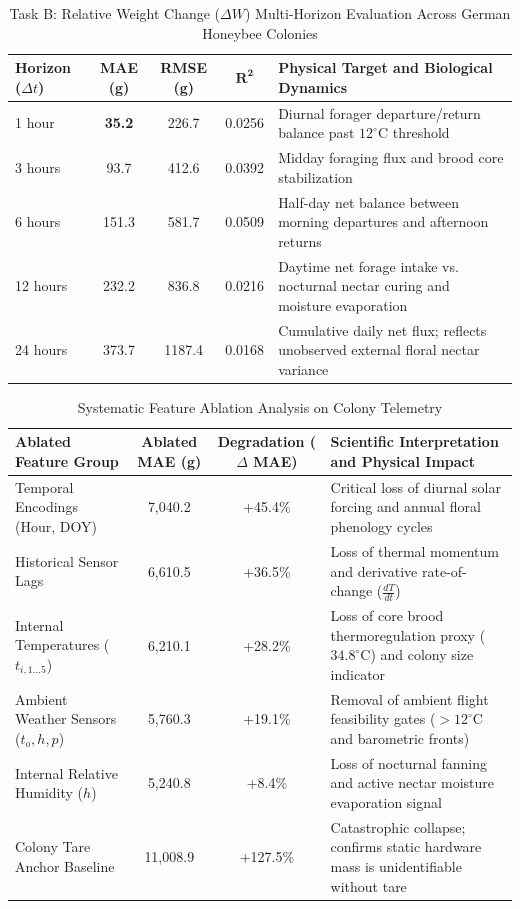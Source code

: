 \documentclass[10pt,twocolumn]{article}
\begin{document}
\begin{table}[t]
\centering
\small
\caption{Task B: Relative Weight Change ($\Delta W$) Multi-Horizon Evaluation Across German Honeybee Colonies}
\label{tab:task_b}
\vspace{0.1cm}
\begin{tabularx}{\textwidth}{l c c c X}
\toprule
\textbf{Horizon ($\Delta t$)} & \textbf{MAE (g)} & \textbf{RMSE (g)} & $\mathbf{R^2}$ & \textbf{Physical Target and Biological Dynamics} \\
\midrule
1 hour & \textbf{35.2} & 226.7 & 0.0256 & Diurnal forager departure/return balance past $12^\circ\text{C}$ threshold \\
3 hours & 93.7 & 412.6 & 0.0392 & Midday foraging flux and brood core stabilization \\
6 hours & 151.3 & 581.7 & 0.0509 & Half-day net balance between morning departures and afternoon returns \\
12 hours & 232.2 & 836.8 & 0.0216 & Daytime net forage intake vs. nocturnal nectar curing and moisture evaporation \\
24 hours & 373.7 & 1187.4 & 0.0168 & Cumulative daily net flux; reflects unobserved external floral nectar variance \\
\bottomrule
\end{tabularx}
\end{table}

\begin{table}[t]
\centering
\small
\caption{Systematic Feature Ablation Analysis on Colony Telemetry}
\label{tab:ablation}
\vspace{0.1cm}
\begin{tabularx}{\textwidth}{l c c X}
\toprule
\textbf{Ablated Feature Group} & \textbf{Ablated MAE (g)} & \textbf{Degradation ($\Delta$ MAE)} & \textbf{Scientific Interpretation and Physical Impact} \\
\midrule
Temporal Encodings (Hour, DOY) & 7,040.2 & +45.4\% & Critical loss of diurnal solar forcing and annual floral phenology cycles \\
Historical Sensor Lags & 6,610.5 & +36.5\% & Loss of thermal momentum and derivative rate-of-change ($\frac{dT}{dt}$) \\
Internal Temperatures ($t_{i,1\dots 5}$) & 6,210.1 & +28.2\% & Loss of core brood thermoregulation proxy ($34.8^\circ\text{C}$) and colony size indicator \\
Ambient Weather Sensors ($t_o, h, p$) & 5,760.3 & +19.1\% & Removal of ambient flight feasibility gates ($>12^\circ\text{C}$ and barometric fronts) \\
Internal Relative Humidity ($h$) & 5,240.8 & +8.4\% & Loss of nocturnal fanning and active nectar moisture evaporation signal \\
Colony Tare Anchor Baseline & 11,008.9 & +127.5\% & Catastrophic collapse; confirms static hardware mass is unidentifiable without tare \\
\bottomrule
\end{tabularx}
\end{table}
\end{document}
